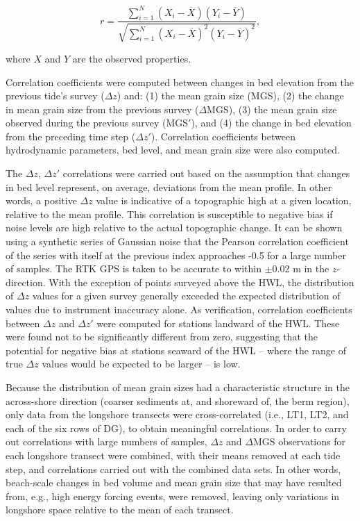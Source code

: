 \begin{equation}\label{eq:pearsons_r}
r = \frac{\sum_{i=1}^{N}(X_i-\overline{X})(Y_i-\overline{Y})}{\sqrt{\sum_{i=1}^{N}(X_i-\overline{X})^2 (Y_i-\overline{Y})^2}},
\end{equation}

\noindent where $X$ and $Y$ are the observed properties.

Correlation coefficients were computed between changes in bed elevation from the previous tide's survey ($\Delta z$) and: (1) the mean grain size (MGS), (2) the change in mean grain size from the previous survey ($\Delta$MGS), (3) the mean grain size observed during the previous survey (MGS$'$), and (4) the change in bed elevation from the preceding time step ($\Delta z'$). Correlation coefficients between hydrodynamic parameters, bed level, and mean grain size were also computed. 

The $\Delta z$, $\Delta z'$ correlations were carried out based on the assumption that changes in bed level represent, on average, deviations from the mean profile. In other words, a positive $\Delta z$ value is indicative of a topographic high at a given location, relative to the mean profile. This correlation is susceptible to negative bias if noise levels are high relative to the actual topographic change. It can be shown using a synthetic series of Gaussian noise that the Pearson correlation coefficient of the series with itself at the previous index approaches -0.5 for a large number of samples. The RTK GPS is taken to be accurate to within $\pm$0.02 m in the $z$-direction. With the exception of points surveyed above the HWL, the distribution of $\Delta z$ values for a given survey generally exceeded the expected distribution of values due to instrument inaccuracy alone. As verification, correlation coefficients between $\Delta z$ and $\Delta z'$ were computed for stations landward of the HWL. These were found not to be significantly different from zero, suggesting that the potential for negative bias at stations seaward of the HWL -- where the range of true $\Delta z$ values would be expected to be larger -- is low.

Because the distribution of mean grain sizes had a characteristic structure in the across-shore direction (coarser sediments at, and shoreward of, the berm region), only data from the longshore transects were cross-correlated (i.e., LT1, LT2, and each of the six rows of DG), to obtain meaningful correlations. In order to carry out correlations with large numbers of samples, $\Delta z$ and $\Delta$MGS observations for each longshore transect were combined, with their means removed at each tide step, and correlations carried out with the combined data sets. In other words, beach-scale changes in bed volume and mean grain size that may have resulted from, e.g., high energy forcing events, were removed, leaving only variations in longshore space relative to the mean of each transect.

